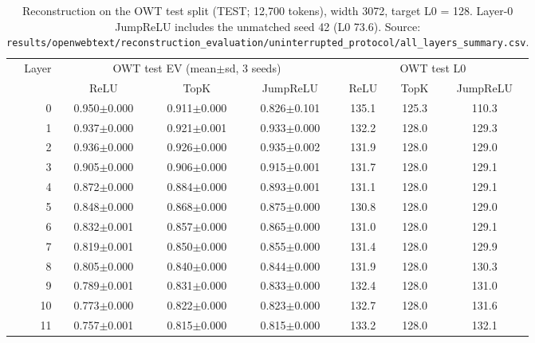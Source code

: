 \begin{table}[t]
\centering
\small
\caption{Reconstruction on the OWT test split (TEST; 12{,}700 tokens), width 3072, target L0 = 128. Layer-0 JumpReLU includes the unmatched seed 42 (L0 73.6). Source: \texttt{results/\allowbreak{}openwebtext/\allowbreak{}reconstruction\_evaluation/\allowbreak{}uninterrupted\_protocol/\allowbreak{}all\_layers\_summary.csv}.}
\label{tab:recon}
\begin{adjustbox}{max width=\linewidth}
\begin{tabular}{rcccccc}
\toprule
Layer & \multicolumn{3}{c}{OWT test EV (mean$\pm$sd, 3 seeds)} & \multicolumn{3}{c}{OWT test L0} \\
\cmidrule(lr){2-4}\cmidrule(lr){5-7}
 & ReLU & TopK & JumpReLU & ReLU & TopK & JumpReLU \\
\midrule
0 & 0.950$\pm$0.000 & 0.911$\pm$0.000 & 0.826$\pm$0.101 & 135.1 & 125.3 & 110.3 \\
1 & 0.937$\pm$0.000 & 0.921$\pm$0.001 & 0.933$\pm$0.000 & 132.2 & 128.0 & 129.3 \\
2 & 0.936$\pm$0.000 & 0.926$\pm$0.000 & 0.935$\pm$0.002 & 131.9 & 128.0 & 129.0 \\
3 & 0.905$\pm$0.000 & 0.906$\pm$0.000 & 0.915$\pm$0.001 & 131.7 & 128.0 & 129.1 \\
4 & 0.872$\pm$0.000 & 0.884$\pm$0.000 & 0.893$\pm$0.001 & 131.1 & 128.0 & 129.1 \\
5 & 0.848$\pm$0.000 & 0.868$\pm$0.000 & 0.875$\pm$0.000 & 130.8 & 128.0 & 129.0 \\
6 & 0.832$\pm$0.001 & 0.857$\pm$0.000 & 0.865$\pm$0.000 & 131.0 & 128.0 & 129.1 \\
7 & 0.819$\pm$0.001 & 0.850$\pm$0.000 & 0.855$\pm$0.000 & 131.4 & 128.0 & 129.9 \\
8 & 0.805$\pm$0.000 & 0.840$\pm$0.000 & 0.844$\pm$0.000 & 131.9 & 128.0 & 130.3 \\
9 & 0.789$\pm$0.001 & 0.831$\pm$0.000 & 0.833$\pm$0.000 & 132.4 & 128.0 & 131.0 \\
10 & 0.773$\pm$0.000 & 0.822$\pm$0.000 & 0.823$\pm$0.000 & 132.7 & 128.0 & 131.6 \\
11 & 0.757$\pm$0.001 & 0.815$\pm$0.000 & 0.815$\pm$0.000 & 133.2 & 128.0 & 132.1 \\
\bottomrule
\end{tabular}
\end{adjustbox}
\end{table}
